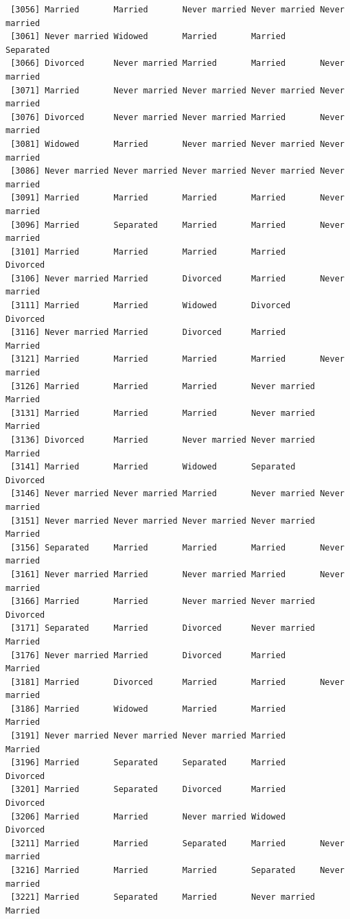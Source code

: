 \documentclass[
  letterpaper,
  DIV=11,
  numbers=noendperiod,
  oneside]{scrartcl}
\begin{document}
\begin{verbatim}
 [3056] Married       Married       Never married Never married Never married
 [3061] Never married Widowed       Married       Married       Separated    
 [3066] Divorced      Never married Married       Married       Never married
 [3071] Married       Never married Never married Never married Never married
 [3076] Divorced      Never married Never married Married       Never married
 [3081] Widowed       Married       Never married Never married Never married
 [3086] Never married Never married Never married Never married Never married
 [3091] Married       Married       Married       Married       Never married
 [3096] Married       Separated     Married       Married       Never married
 [3101] Married       Married       Married       Married       Divorced     
 [3106] Never married Married       Divorced      Married       Never married
 [3111] Married       Married       Widowed       Divorced      Divorced     
 [3116] Never married Married       Divorced      Married       Married      
 [3121] Married       Married       Married       Married       Never married
 [3126] Married       Married       Married       Never married Married      
 [3131] Married       Married       Married       Never married Married      
 [3136] Divorced      Married       Never married Never married Married      
 [3141] Married       Married       Widowed       Separated     Divorced     
 [3146] Never married Never married Married       Never married Never married
 [3151] Never married Never married Never married Never married Married      
 [3156] Separated     Married       Married       Married       Never married
 [3161] Never married Married       Never married Married       Never married
 [3166] Married       Married       Never married Never married Divorced     
 [3171] Separated     Married       Divorced      Never married Married      
 [3176] Never married Married       Divorced      Married       Married      
 [3181] Married       Divorced      Married       Married       Never married
 [3186] Married       Widowed       Married       Married       Married      
 [3191] Never married Never married Never married Married       Married      
 [3196] Married       Separated     Separated     Married       Divorced     
 [3201] Married       Separated     Divorced      Married       Divorced     
 [3206] Married       Married       Never married Widowed       Divorced     
 [3211] Married       Married       Separated     Married       Never married
 [3216] Married       Married       Married       Separated     Never married
 [3221] Married       Separated     Married       Never married Married      

\end{verbatim}
\end{document}
